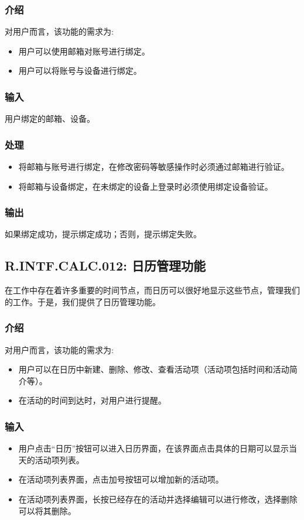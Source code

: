 \subsubsection{介绍}
对用户而言，该功能的需求为:
\begin{itemize}
  \item 用户可以使用邮箱对账号进行绑定。
  \item 用户可以将账号与设备进行绑定。
\end{itemize}
\subsubsection{输入}
用户绑定的邮箱、设备。
\subsubsection{处理}
\begin{itemize}
  \item 将邮箱与账号进行绑定，在修改密码等敏感操作时必须通过邮箱进行验证。
  \item 将邮箱与设备绑定，在未绑定的设备上登录时必须使用绑定设备验证。
\end{itemize}
\subsubsection{输出}
如果绑定成功，提示绑定成功；否则，提示绑定失败。

\subsection{R.INTF.CALC.012: 日历管理功能}
在工作中存在着许多重要的时间节点，而日历可以很好地显示这些节点，管理我们的工作。于是，我们提供了日历管理功能。
\subsubsection{介绍}
对用户而言，该功能的需求为:
\begin{itemize}
  \item 用户可以在日历中新建、删除、修改、查看活动项（活动项包括时间和活动简介等）。
  \item 在活动的时间到达时，对用户进行提醒。
\end{itemize}
\subsubsection{输入}
\begin{itemize}
  \item 用户点击“日历”按钮可以进入日历界面，在该界面点击具体的日期可以显示当天的活动项列表。
  \item 在活动项列表界面，点击加号按钮可以增加新的活动项。
  \item 在活动项列表界面，长按已经存在的活动并选择编辑可以进行修改，选择删除可以将其删除。
\end{itemize}

